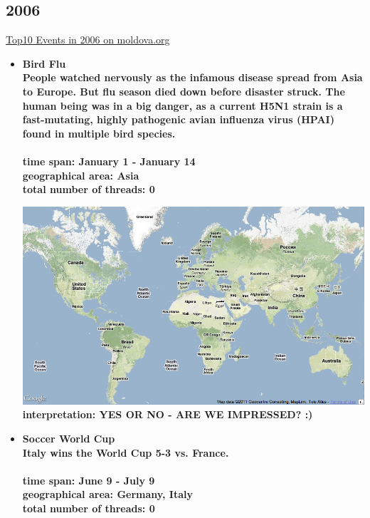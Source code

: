 \documentclass[11pt,a4paper,english]{article}
\begin{document}
			\subsection{2006}
			\href{http://social.moldova.org/news/10-most-important-world-events-of-2006-217385-eng.html}{Top10 Events in 2006 on moldova.org}
				\begin{itemize}
					\item \bf Bird Flu \rm
						\\ People watched nervously as the infamous disease spread from Asia to Europe. But flu season died down before disaster struck. The human being was in a big danger, as a current H5N1 strain is a fast-mutating, highly pathogenic avian influenza virus (HPAI) found in multiple bird species.
						\\\\ \bf time span: \rm January 1 - January 14
						\\ \bf geographical area: \rm Asia
						\\ \bf total number of threads: \rm 0
						
						\includegraphics[width=130mm]{img/2005-1}
						\bf interpretation: \rm YES OR NO - ARE WE IMPRESSED? :)
					
					
					
					\item \bf Soccer World Cup \rm
						\\ Italy wins the World Cup 5-3 vs. France.
						\\\\ \bf time span: \rm June 9 - July 9
						\\ \bf geographical area: \rm Germany, Italy
						\\ \bf total number of threads: \rm 0
						

\end{itemize}
\end{document}
